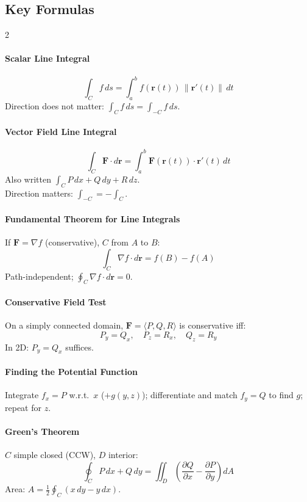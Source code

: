 \subsection*{Key Formulas}
\begin{multicols}{2}

\paragraph{Scalar Line Integral}
\[
\int_C f\,ds = \int_a^b f(\mathbf{r}(t))\,\|\mathbf{r}'(t)\|\,dt
\]
Direction does not matter: $\int_C f\,ds = \int_{-C} f\,ds$.

\paragraph{Vector Field Line Integral}
\[
\int_C \mathbf{F}\cdot d\mathbf{r} = \int_a^b \mathbf{F}(\mathbf{r}(t))\cdot\mathbf{r}'(t)\,dt
\]
Also written $\int_C P\,dx + Q\,dy + R\,dz$.\\
Direction matters: $\int_{-C} = -\int_C$.

\paragraph{Fundamental Theorem for Line Integrals}
If $\mathbf{F} = \nabla f$ (conservative), $C$ from $A$ to $B$:
\[
\int_C \nabla f\cdot d\mathbf{r} = f(B) - f(A)
\]
Path-independent; $\oint_C \nabla f\cdot d\mathbf{r} = 0$.

\paragraph{Conservative Field Test}
On a simply connected domain, $\mathbf{F} = \langle P,Q,R\rangle$ is conservative iff:
\[
P_y = Q_x, \quad P_z = R_x, \quad Q_z = R_y
\]
In 2D: $P_y = Q_x$ suffices.

\paragraph{Finding the Potential Function}
Integrate $f_x = P$ w.r.t.\ $x$ ($+g(y,z)$); differentiate and match $f_y = Q$ to find $g$; repeat for $z$.

\paragraph{Green's Theorem}
$C$ simple closed (CCW), $D$ interior:
\[
\oint_C P\,dx + Q\,dy = \iint_D\!\left(\frac{\partial Q}{\partial x} - \frac{\partial P}{\partial y}\right)dA
\]
Area: $A = \frac{1}{2}\oint_C(x\,dy - y\,dx)$.


\end{multicols}
